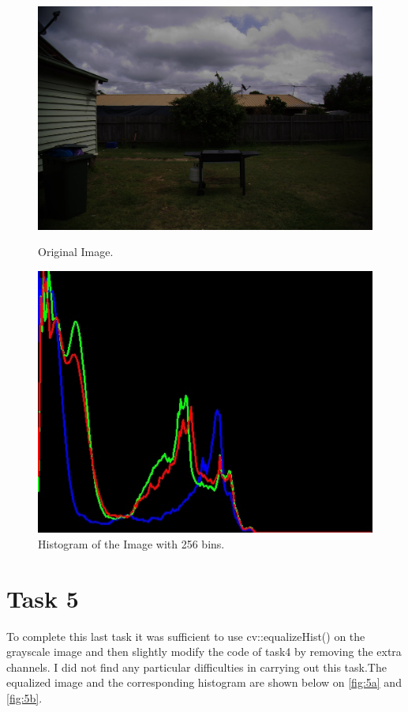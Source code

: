 \begin{figure}[h]
	\centering
	\begin{minipage}{0.45\textwidth}
		\centering
		\includegraphics[width=\linewidth]{images/source/task4/2}
		\caption{Original Image.}
		\label{fig:4a}
        \end{minipage}
        \hspace{0.05\textwidth}
        \begin{minipage}{0.45\textwidth}
        		\centering
		\includegraphics[width=\linewidth]{images/source/task4/1}
		\caption{Histogram of the Image with 256 bins.}
		\label{fig:4b}
        \end{minipage}
\end{figure}

\chapter{Task 5}
To complete this last task it was sufficient to use cv::equalizeHist() on the grayscale image and then slightly modify the code of task4 by removing the extra channels. I did not find any particular difficulties in carrying out this task.The equalized image and the corresponding histogram are shown below on \ref{fig:5a} and \ref{fig:5b}.

